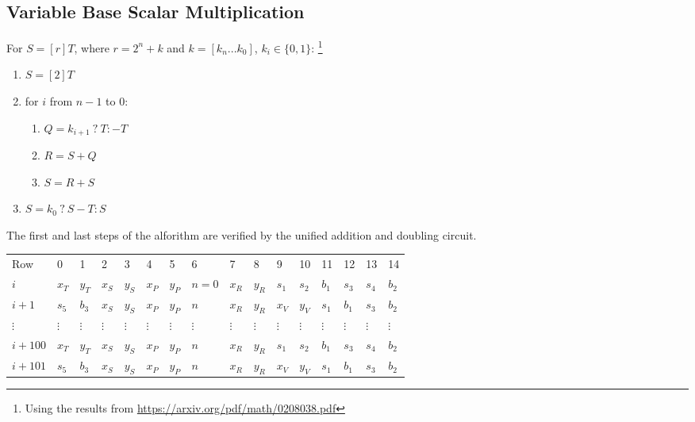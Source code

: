 \subsection{Variable Base Scalar Multiplication}
For $S  = [r]T$, where $r = 2^n + k$ and $k = [k_n ... k_0]$, $k_i \in \{0, 1\}$:
\footnote{Using the results from \url{https://arxiv.org/pdf/math/0208038.pdf}}
\begin{enumerate}
    \item $S = [2]T$
    \item for $i$ from $n - 1$ to $0$:
    \begin{enumerate}
        \item $Q = k_{i + 1} \: ? \: T : -T$
        \item $R = S + Q$
        \item $S = R + S$
    \end{enumerate}
    \item $S = k_0 \: ? \: S - T : S$
\end{enumerate}

The first and last steps of the alforithm are verified by the unified addition and doubling circuit. 

\begin{center}
    \begin{table}[H]
        \begin{tabular}{llllllllllllllll}
            Row     & 0        & 1        & 2        & 3        & 4        & 5        & 6        & 7        & 8        & 9        & 10       & 11       & 12       & 13       & 14       \\
            $i$    & $x_T$    & $y_T$    & $x_S$    & $y_S$    & $x_P$    & $y_P$    & $n=0$    & $x_R$    & $y_R$    & $s_1$    & $s_2$    & $b_1$    & $s_3$ & $s_4$ & $b_2$ \\
            $i + 1$   & $s_5$    & $b_3$    & $x_S$    & $y_S$    & $x_P$    & $y_P$    & $n$      & $x_R$    & $y_R$    & $x_V$    & $y_V$    & $s_1$    & $b_1$ & $s_3$ & $b_2$ \\
            $\vdots$  & $\vdots$ & $\vdots$ & $\vdots$ & $\vdots$ & $\vdots$ & $\vdots$ & $\vdots$ & $\vdots$ & $\vdots$ & $\vdots$ & $\vdots$ & $\vdots$ & $\vdots$ & $\vdots$ & $\vdots$ \\
            $i + 100$ & $x_T$    & $y_T$    & $x_S$    & $y_S$    & $x_P$    & $y_P$    & $n$      & $x_R$    & $y_R$    & $s_1$    & $s_2$    & $b_1$ & $s_3$ & $s_4$ & $b_2$ \\
            $i + 101$ & $s_5$    & $b_3$    & $x_S$    & $y_S$    & $x_P$    & $y_P$    & $n$      & $x_R$    & $y_R$    & $x_V$    & $y_V$    & $s_1$ & $b_1$ & $s_3$ & $b_2$ \\
        \end{tabular}
    \end{table}
\end{center}

